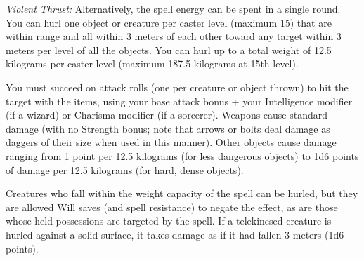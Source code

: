 {	\textit{Violent Thrust:}
	Alternatively, the spell energy can be spent in a single round. You can hurl one object or creature per caster level (maximum 15) that are within range and all within 3 meters of each other toward any target within 3 meters per level of all the objects. You can hurl up to a total weight of 12.5 kilograms per caster level (maximum 187.5 kilograms at 15th level).

	You must succeed on attack rolls (one per creature or object thrown) to hit the target with the items, using your base attack bonus + your Intelligence modifier (if a wizard) or Charisma modifier (if a sorcerer). Weapons cause standard damage (with no Strength bonus; note that arrows or bolts deal damage as daggers of their size when used in this manner). Other objects cause damage ranging from 1 point per 12.5 kilograms (for less dangerous objects) to 1d6 points of damage per 12.5 kilograms (for hard, dense objects).

	Creatures who fall within the weight capacity of the spell can be hurled, but they are allowed Will saves (and spell resistance) to negate the effect, as are those whose held possessions are targeted by the spell. If a telekinesed creature is hurled against a solid surface, it takes damage as if it had fallen 3 meters (1d6 points).

}
